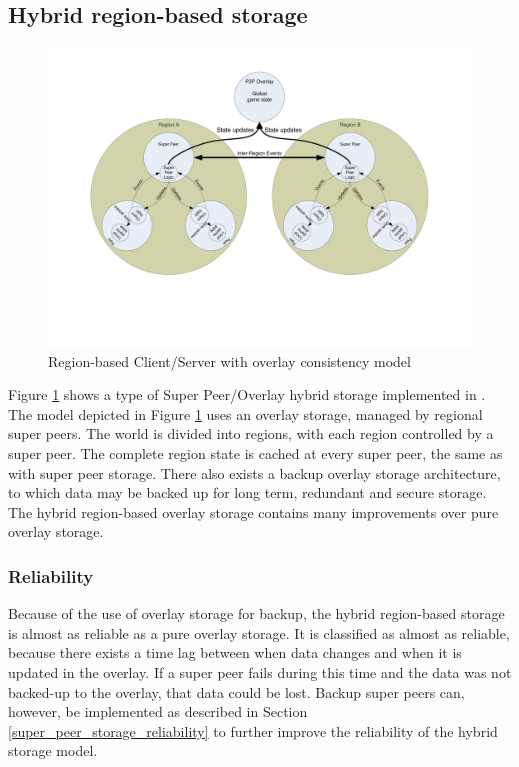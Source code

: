 \documentclass[10pt,a4paper,journal,cspaper,compsoc]{IEEEtran}
\begin{document}
\subsection{Hybrid region-based storage}
\label{hybrid_storage}

\begin{figure}[htbp]
 \centering
 \includegraphics[clip=true, viewport=2cm 5cm 27cm 19.5cm, width=\textwidth]{region_based_CS_CM_P2PO}
 \caption{Region-based Client/Server with overlay consistency model}
 \label{fig_cs_region_o_cm}
\end{figure}
%
Figure \ref{fig_cs_region_o_cm} shows a type of Super Peer/Overlay hybrid storage implemented in \cite{zoned_federation}. The model depicted in
Figure \ref{fig_cs_region_o_cm} uses an overlay storage, managed by regional super peers. The world is divided into regions, with each region
controlled by a super peer. The complete region state is cached at every super peer, the same as with super peer storage. There also exists a backup
overlay storage architecture, to which data may be backed up for long term, redundant and secure storage. The hybrid region-based overlay storage
contains many improvements over pure overlay storage.

\subsubsection{Reliability}
\label{hybrid_storage_reliability}

Because of the use of overlay storage for backup, the hybrid region-based storage is almost as reliable as a pure overlay storage. It is classified
as almost as reliable, because there exists a time lag between when data changes and when it is updated in the overlay. If a super peer fails during
this time and the data was not backed-up to the overlay, that data could be lost. Backup super peers can, however, be implemented as described in
Section \ref{super_peer_storage_reliability} to further improve the reliability of the hybrid storage model.
\end{document}
